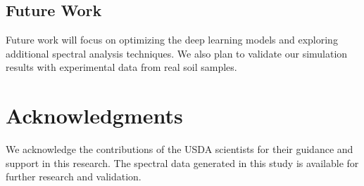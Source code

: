 \documentclass[review]{elsarticle}
\begin{document}
\subsection{Future Work}

Future work will focus on optimizing the deep learning models and exploring additional spectral analysis techniques. We also plan to validate our simulation results with experimental data from real soil samples.

\section{Acknowledgments}

We acknowledge the contributions of the USDA scientists for their guidance and support in this research. The spectral data generated in this study is available for further research and validation.





\end{document}
